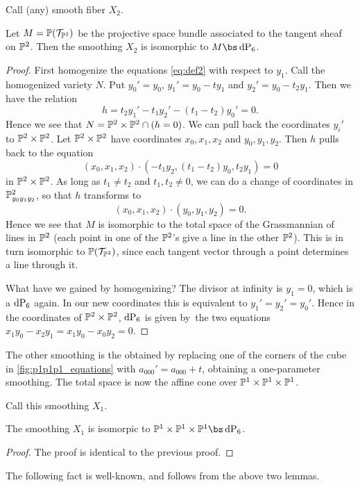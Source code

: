Call (any) smooth fiber $X_2$. 

\begin{lemma}
Let $M=\P(\mathcal T_ {\P^2})$ be the projective space bundle associated to the tangent sheaf on $\P^2$. Then the smoothing $X_2$ is isomorphic to $M \bs \dP6$. 
\end{lemma}
\begin{proof}
First homogenize the equations \eqref{eq:def2} with respect to $y_1$. Call the homogenized variety $N$. Put $y_0'=y_0$, $y_1' = y_0-ty_1$ and $y_2'=y_0-t_2y_1$. Then we have the relation
\[
h = t_2y_1'-t_1y_2' - (t_1-t_2)y_0' = 0.
\]
Hence we see that $N=\P^2 \times \P^2 \cap (h = 0)$. We can pull back the coordinates $y_i'$ to $\P^2 \times \P^2$. Let $\P^2 \times \P^2$ have coordinates $x_0,x_1,x_2$ and $y_0,y_1,y_2$. Then $h$ pulls back to the equation
\[
(x_0,x_1,x_2) \cdot (-t_1y_2, (t_1-t_2)y_0,t_2y_1) = 0
\]
in $\P^2 \times \P^2$. As long as $t_1 \neq t_2$ and $t_1,t_2 \neq 0$, we can do a change of coordinates in $\P^2_{y_0y_1y_2}$, so that $h$ transforms to
\[
(x_0,x_1,x_2) \cdot(y_0,y_1,y_2) = 0.
\]
Hence we see that $M$ is isomorphic to the total space of the Grassmannian of lines in $\P^2$ (each point in one of the $\P^2$'s give a line in the other $\P^2$). This is in turn isomorphic to $\P(\mathcal T_{\P^2})$, since each tangent vector through a point determines a line through it.

What have we gained by homogenizing? The divisor at infinity is $y_1=0$, which is a $\dP6$ again. In our new coordinates this is equivalent to $y_1'=y_2'=y_0'$. Hence in the coordinates of $\P^2 \times \P^2$, $\dP6$ is given by the two equations $x_1y_0-x_2y_1=x_1y_0-x_0y_2=0$. 
\end{proof}

The other smoothing is the obtained by replacing one of the corners of the cube in \cref{fig:p1p1p1_equations} with $a_{000}'=a_{000}+t$, obtaining a one-parameter smoothing. The total space is now the affine cone over $\P^1 \times \P^1 \times \P^1$. 

Call this smoothing $X_1.$

\begin{lemma}
The smoothing $X_1$ is isomorpic to $\P^1 \times \P^1 \times \P^1 \bs \dP6$.
\end{lemma}
\begin{proof}
The proof is identical to the previous proof.
\end{proof}

The following fact is well-known, and follows from the above two lemmas.


